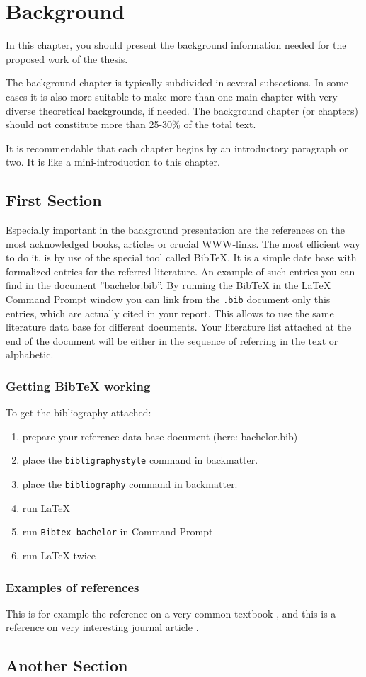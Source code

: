 \chapter{Background}\label{chap:background} 


In this chapter, you should present the background information needed for the
proposed work of the thesis. 


The background chapter is typically subdivided in several subsections.
In some cases it is also more suitable to make more than one main
chapter with very diverse theoretical backgrounds, if needed.
The background chapter (or chapters) should not constitute
more than 25-30\% of the total text.


It is recommendable that each chapter begins by an introductory 
paragraph or two. It is like a mini-introduction to this chapter. 


\section{First Section}

Especially important in the background  presentation are the references on
the most acknowledged books, articles or crucial WWW-links.  The most
efficient way to do it, is by use of the special tool called BibTeX.
It is a simple date base with formalized entries for the referred
literature.  An example of such entries you can find in the document
''bachelor.bib''.  By running the BibTeX in the LaTeX Command
Prompt window you can link from the \verb+.bib+ document only this entries,
which are actually cited in your report.  This allows to use the same
literature data base for different documents.  Your literature list
attached at the end of the document will be either in the sequence of
referring in the text or alphabetic.

\subsection{Getting BibTeX working}
\label{ss:bib-attach}

To get the bibliography attached:

\begin{enumerate}
    \item prepare your reference data base document (here: bachelor.bib)
    \item place the \verb"bibligraphystyle" command in backmatter.
    \item place the \verb"bibliography" command in backmatter.
    \item run LaTeX
    \item run \verb"Bibtex bachelor" in Command Prompt
    \item run LaTeX twice
\end{enumerate}

\subsection{Examples of references}
\label{ss:bib-ref-exe}


This is for example the reference on a very common textbook \cite{AbdennadherFruhwirth02},
and this is a reference on very interesting journal article \cite{AbdennadherRigotti05}.




\section{Another Section}
